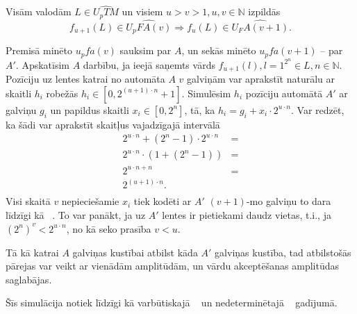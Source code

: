 \documentclass{ludis}
\begin{document}
\begin{lemma} \label{plus1}
Visām valodām $L \in \widehat{U_pTM}$ un visiem $u > v > 1, u, v \in \mathbb{N}$ izpildās
\[
	f_{u+1}(L) \in \widehat{U_pFA(v)} \Rightarrow f_u(L) \in \widehat{U_FA(v + 1)}.
\]
\end{lemma}
\begin{pieradijums}
Premisā minēto $u_pfa(v)$ sauksim par $A$, un sekās minēto $u_pfa(v + 1)$ -- par $A'$.
Apskatīsim $A$ darbību, ja ieejā saņemts vārds $f_{u+1}(l), l = 1^{2^n} \in L, n \in \mathbb{N}$. Pozīciju uz lentes katrai no automāta $A$ $v$ galviņām var aprakstīt naturālu ar skaitli $h_i$ robežās $h_i \in \left[0, 2^{(u + 1) \cdot n} + 1 \right]$. Simulēsim $h_i$ pozīciju automātā $A'$ ar galviņu $g_i$ un papildus skaitli $x_i \in \left[ 0, 2^n \right]$, tā, ka $h_i = g_i + x_i \cdot 2^{u \cdot n}$. Var redzēt, ka šādi var aprakstīt skaitļus vajadzīgajā intervālā
\begin{align*}
	2^{u \cdot n} + (2^n - 1) \cdot 2^{u \cdot n} & =\\
	2^{u \cdot n} \cdot (1 + (2^n - 1)) & =\\
	2^{u \cdot n + n} & =\\
	2^{(u + 1) \cdot n}.\\
\end{align*}
Visi skaitā $v$ nepieciešamie $x_i$ tiek kodēti ar $A'$ $(v+1)$-mo galviņu to dara līdzīgi kā ~\citep{Monien1980}.
To var panākt, ja uz $A'$ lentes ir pietiekami daudz vietas, t.i., ja $(2^n)^v < 2^{u \cdot n}$, no kā seko prasība $v < u$.

Tā kā katrai $A$ galviņas kustībai atbilst kāda $A'$ galviņas kustība, tad atbilstošās pārejas var veikt ar vienādām amplitūdām, un vārdu akceptēšanas amplitūdas saglabājas.

Šīs simulācija notiek līdzīgi kā varbūtiskajā ~\citep{Macarie1995} un nedeterminētajā ~\citep{Monien1980} gadījumā.
\end{pieradijums}
\end{document}
